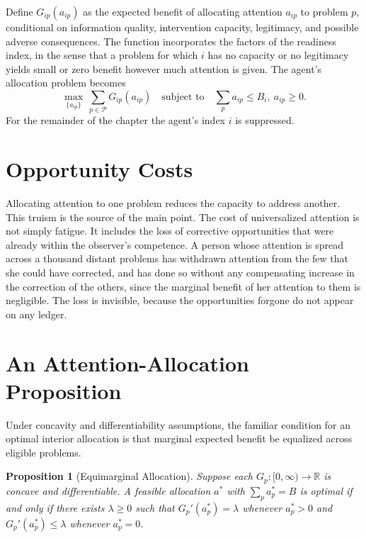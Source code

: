 \documentclass[11pt]{report}
\newtheorem{proposition}[theorem]{Proposition}
\theoremstyle{definition}
\theoremstyle{remark}
\newcommand{\RR}{\mathbb{R}}
\newcommand{\cP}{\mathcal{P}}
\begin{document}
Define $G_{ip}(a_{ip})$ as the expected benefit of allocating attention $a_{ip}$ to problem $p$, conditional on information quality, intervention capacity, legitimacy, and possible adverse consequences. The function incorporates the factors of the readiness index, in the sense that a problem for which $i$ has no capacity or no legitimacy yields small or zero benefit however much attention is given. The agent's allocation problem becomes
\[
\max_{\{a_{ip}\}}\ \sum_{p\in\cP}G_{ip}(a_{ip})\quad\text{subject to}\quad \sum_pa_{ip}\le B_i,\ a_{ip}\ge0 .
\]
For the remainder of the chapter the agent's index $i$ is suppressed.

\section{Opportunity Costs}

Allocating attention to one problem reduces the capacity to address another. This truism is the source of the main point. The cost of universalized attention is not simply fatigue. It includes the loss of corrective opportunities that were already within the observer's competence. A person whose attention is spread across a thousand distant problems has withdrawn attention from the few that she could have corrected, and has done so without any compensating increase in the correction of the others, since the marginal benefit of her attention to them is negligible. The loss is invisible, because the opportunities forgone do not appear on any ledger.

\section{An Attention-Allocation Proposition}

Under concavity and differentiability assumptions, the familiar condition for an optimal interior allocation is that marginal expected benefit be equalized across eligible problems.

\begin{proposition}[Equimarginal Allocation]\label{prop:equimarg}
Suppose each $G_p:[0,\infty)\to\RR$ is concave and differentiable. A feasible allocation $a^\ast$ with $\sum_pa^\ast_p=B$ is optimal if and only if there exists $\lambda\ge0$ such that $G_p'(a_p^\ast)=\lambda$ whenever $a_p^\ast>0$ and $G_p'(a_p^\ast)\le\lambda$ whenever $a_p^\ast=0$.
\end{proposition}
\end{document}
